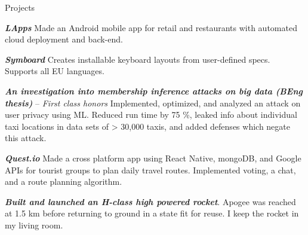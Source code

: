 \documentclass[10pt]{resume} %
\begin{document}
\begin{rSection}{Projects}

  \item \textbf{\textit{LApps}} Made an Android mobile app for retail and
    restaurants with automated cloud deployment and back-end.
  \item \textbf{\textit{Symboard}} Creates installable keyboard layouts from
    user-defined specs. Supports all EU languages.
  \item \textbf{\textit{An investigation into membership inference attacks on
    big data (BEng thesis)}} -- \textit{First class honors} Implemented,
    optimized, and analyzed an attack on user privacy using ML. Reduced run time
    by 75 \%, leaked info about individual taxi locations in data sets of >
    30,000 taxis, and added defenses which negate this attack.
  \item \textbf{\textit{Quest.io}} Made a cross platform app using
    React Native, mongoDB, and Google APIs for tourist groups to plan daily
    travel routes. Implemented voting, a chat, and a route planning algorithm.
  \item \textbf{\textit{Built and launched an H-class high powered rocket}}.
    Apogee was reached at 1.5 km before returning to ground in a
    state fit for reuse. I keep the rocket in my living room.

\end{rSection}
\end{document}
